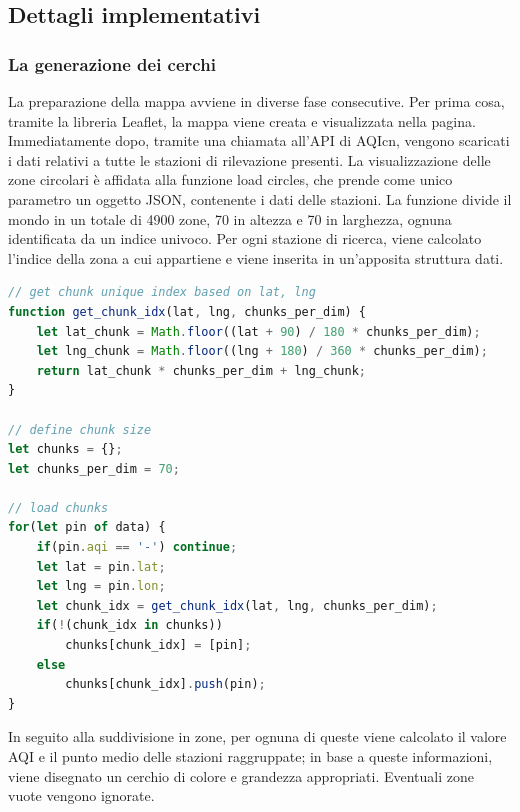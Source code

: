 \subsection{Dettagli implementativi}
\subsubsection{La generazione dei cerchi}
La preparazione della mappa avviene in diverse fase consecutive.
Per prima cosa, tramite la libreria Leaflet, la mappa viene creata e visualizzata nella pagina.
Immediatamente dopo, tramite una chiamata all'API di AQIcn, vengono scaricati i dati relativi a tutte le stazioni di rilevazione presenti.
La visualizzazione delle zone circolari è affidata alla funzione load circles, che prende come unico parametro un oggetto JSON, contenente i dati delle stazioni.
La funzione divide il mondo in un totale di 4900 zone, 70 in altezza e 70 in larghezza, ognuna identificata da un indice univoco.
Per ogni stazione di ricerca, viene calcolato l'indice della zona a cui appartiene e viene inserita in un'apposita struttura dati.
\begin{lstlisting}[language=Javascript]
// get chunk unique index based on lat, lng
function get_chunk_idx(lat, lng, chunks_per_dim) {
    let lat_chunk = Math.floor((lat + 90) / 180 * chunks_per_dim);
    let lng_chunk = Math.floor((lng + 180) / 360 * chunks_per_dim);
    return lat_chunk * chunks_per_dim + lng_chunk;
}

// define chunk size
let chunks = {};
let chunks_per_dim = 70;   

// load chunks
for(let pin of data) {
    if(pin.aqi == '-') continue;
    let lat = pin.lat;
    let lng = pin.lon;
    let chunk_idx = get_chunk_idx(lat, lng, chunks_per_dim);
    if(!(chunk_idx in chunks)) 
        chunks[chunk_idx] = [pin];
    else 
        chunks[chunk_idx].push(pin);
}
\end{lstlisting}
In seguito alla suddivisione in zone, per ognuna di queste viene calcolato il valore AQI e il punto medio delle stazioni raggruppate; 
in base a queste informazioni, viene disegnato un cerchio di colore e grandezza appropriati. Eventuali zone vuote vengono ignorate.


